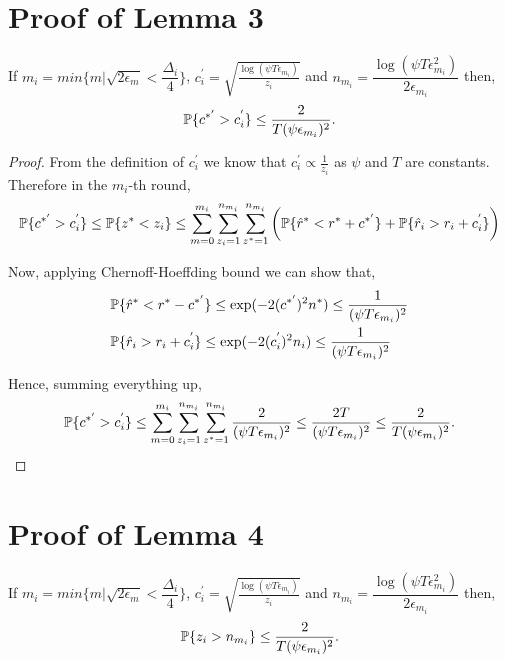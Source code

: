 \section{Proof of Lemma 3}
\label{App:Lemma3}
\begin{lemma}
\label{proofTheorem:Lemma:3}
If $m_i = min\lbrace m|\sqrt{2\epsilon_{m} } < \dfrac{\Delta_i}{4} \rbrace $, $c_{i}^{'} =\sqrt{\frac{\log (\psi T\epsilon_{m_{i}})}{z_{i}}}$ and $n_{m_i}=\dfrac{\log{(\psi T\epsilon_{m_{i}}^{2})}}{2\epsilon_{m_{i}}}$ then, 
\begin{align*}
\mathbb{P}\lbrace c^{*'} > c_i^{'} \rbrace \leq \dfrac{2}{T(\psi \epsilon_{m_i})^2}.
\end{align*}
\end{lemma}

\begin{proof}
From the definition of $c_i^{'}$ we know that $c_i^{'}\propto \frac{1}{z_i}$ as $\psi$ and $T$ are constants. Therefore in the $m_i$-th round,
\begin{align*}
\mathbb{P}\lbrace c^{*'} > c_i^{'} \rbrace \leq  \mathbb{P}\lbrace  z^* < z_i  \rbrace \leq \sum_{m=0}^{m_i}\sum_{z_i =1}^{n_{m_i}}\sum_{z^* =1}^{n_{m_i}}\bigg(\mathbb{P}\lbrace \hat{r}^* < r^* + c^{*'}\rbrace + \mathbb{P}\lbrace \hat{r}_i > r_i + c_i^{'}\rbrace\bigg)
\end{align*}

Now, applying Chernoff-Hoeffding bound we can show that,
\begin{align*}
&\mathbb{P}\lbrace \hat{r}^* < r^* - c^{*'}\rbrace \leq \exp(- 2(c^{*'})^2 n^*)\leq \frac{1}{(\psi T\epsilon_{m_i})^2} \\ 
&\mathbb{P}\lbrace \hat{r}_i > r_i + c_i^{'}\rbrace \leq \exp(- 2(c_i^{'})^2 n_i)\leq \frac{1}{(\psi T\epsilon_{m_i})^2}
\end{align*}

Hence, summing everything up, 
\begin{align*}
\mathbb{P}\lbrace c^{*'} > c_i^{'} \rbrace \leq \sum_{m=0}^{m_i}\sum_{z_i =1}^{n_{m_i}}\sum_{z^* =1}^{n_{m_i}} \dfrac{2}{(\psi T\epsilon_{m_i})^2} \leq \dfrac{2T}{(\psi T\epsilon_{m_i})^2} \leq \dfrac{2}{T(\psi\epsilon_{m_i})^2}.
\end{align*}

\end{proof}


\section{Proof of Lemma 4}
\label{App:Lemma4}
\begin{lemma}
\label{proofTheorem:Lemma:4}
If $m_i = min\lbrace m|\sqrt{2\epsilon_{m} } < \dfrac{\Delta_i}{4} \rbrace $, $c_{i}^{'} =\sqrt{\frac{\log (\psi T\epsilon_{m_{i}})}{ z_{i}}}$ and $n_{m_i}=\dfrac{\log{(\psi T\epsilon_{m_{i}}^{2})}}{2\epsilon_{m_{i}}}$ then, 
\begin{align*}
\mathbb{P}\lbrace z_i > n_{m_i} \rbrace \leq \dfrac{2}{T(\psi \epsilon_{m_i})^2}.
\end{align*}
\end{lemma}

